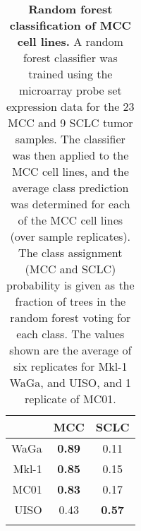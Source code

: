 \documentclass[10pt]{article}
\begin{document}
\begin{table}[H]

  \begin{center}
    
    \caption{
      \textbf{Random forest classification of MCC cell lines.}
      A random forest classifier was trained using the microarray probe set expression data for the 23 MCC and 9 SCLC tumor samples.
      The classifier was then applied to the MCC cell lines, and the average class prediction was determined for each of the MCC cell lines (over sample replicates).
      The class assignment (MCC and SCLC) probability is given as the fraction of trees in the random forest voting for each class.
      The values shown are the average of six replicates for Mkl-1 WaGa, and UISO, and 1 replicate of MC01.
    }
    
    \begin{tabular}{rcc}
      \hline 
      & MCC  & SCLC \tabularnewline
      \hline 
      WaGa & \textbf{0.89} & 0.11\tabularnewline
      Mkl-1 & \textbf{0.85} & 0.15\tabularnewline
      MC01 & \textbf{0.83} & 0.17\tabularnewline
      UISO & 0.43 & \textbf{0.57}\tabularnewline
      \hline 
      \label{tab:classifier}

    \end{tabular}
    
  \end{center}
  
\end{table}
\end{document}
